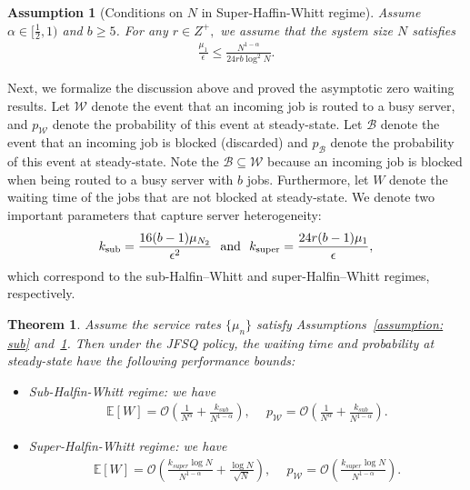 \documentclass[11pt,oneside,letter]{article}
\newtheorem{theorem}{Theorem}
\newtheorem{assumption}{Assumption}
\begin{document}
\begin{assumption}[Conditions on \(N\) in Super-Haffin-Whitt regime]
Assume $\alpha \in [\tfrac{1}{2}, 1)$ and $b \geq 5$. {For any $r \in Z^{+},$} we assume that the system size $N$ satisfies
\begin{align*}
\frac{\mu_1}{\epsilon} \leq \frac{N^{1-\alpha}}{24rb\log^2 N}. 
\end{align*} \label{assumption: super}
\end{assumption}
Next, we formalize the discussion above and proved the asymptotic zero waiting results. 
Let $\mathcal W$ denote the event that an incoming job is routed to a busy server, and $p_{\mathcal W}$ denote the probability of this event at steady-state. Let $\mathcal B$ denote the event that an incoming job is blocked (discarded) and $p_{\mathcal B}$ denote the probability of this event at steady-state. {Note the  ${\mathcal B}\subseteq {\mathcal W}$ because an incoming job is blocked when being routed to a busy server with $b$ jobs.} 
Furthermore, let $W$ denote the  waiting time of the jobs that are not blocked at steady-state. 
We denote two important parameters that capture server heterogeneity:
\begin{align*}
k_{\mathrm{sub}} = \frac{16(b-1)\mu_{N_2}}{\epsilon^2}~~\textup{and}~~ 
k_{\mathrm{super}} = \frac{24r(b-1)\mu_1}{\epsilon},
\end{align*}
which correspond to the sub-Halfin--Whitt and super-Halfin--Whitt regimes, respectively. 
\begin{theorem}\label{thm:zerodelay}
Assume the service rates $\{\mu_n\}$ satisfy Assumptions~\ref{assumption: sub} and~\ref{assumption: super}. Then under the JFSQ policy, the waiting time and probability at steady-state have the following performance bounds: 
\begin{itemize}[leftmargin=*]
\item[1)]  {Sub-Halfin-Whitt regime:} 
we have
\begin{align*}
\mathbb{E}[W] = \mathcal{O}\left( \frac{1}{N^\alpha} + \frac{k_{sub}}{N^{1 - \alpha}} \right), &~~
p_{\mathcal{W}} = \mathcal{O}\left( \frac{1}{N^\alpha} + \frac{k_{sub}}{N^{1-\alpha}}\right).
\end{align*}

\item[2)] {Super-Halfin-Whitt regime:} 
we have
\begin{align*}
\mathbb{E}[W] = \mathcal{O}\left( \frac{k_{super} \log N}{N^{1 - \alpha}} + \frac{\log N}{\sqrt{N}} \right), &~~
p_{\mathcal{W}} = \mathcal{O}\left( \frac{k_{super} \log N}{N^{1 - \alpha}} \right).
\end{align*}
\end{itemize}
\end{theorem}
\end{document}

